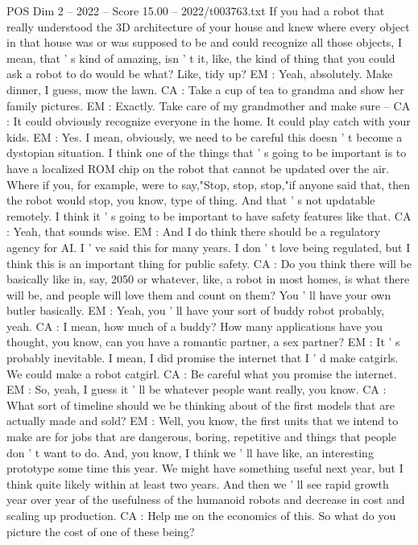 \begin{textsample}{POS Dim 2 – 2022 – Score 15.00 – 2022/t003763.txt}
If you had a robot that really understood the 3D architecture of your house and knew where every object in that house was or was supposed to be and could recognize all those objects, I mean, that ' s kind of amazing, isn ' t it, like, the kind of thing that you could ask a robot to do would be what?
Like, tidy up?
EM : Yeah, absolutely.
Make dinner, I guess, mow the lawn.
CA : Take a cup of tea to grandma and show her family pictures.
EM : Exactly.
Take care of my grandmother and make sure -- CA : It could obviously recognize everyone in the home.
It could play catch with your kids.
EM : Yes.
I mean, obviously, we need to be careful this doesn ' t become a dystopian situation.
I think one of the things that ' s going to be important is to have a localized ROM chip on the robot that cannot be updated over the air.
Where if you, for example, were to say,"Stop, stop, stop,"if anyone said that, then the robot would stop, you know, type of thing.
And that ' s not updatable remotely.
I think it ' s going to be important to have safety features like that.
CA : Yeah, that sounds wise.
EM : And I do think there should be a regulatory agency for AI.
I ' ve said this for many years.
I don ' t love being regulated, but I think this is an important thing for public safety.
CA : Do you think there will be basically like in, say, 2050 or whatever, like, a robot in most homes, is what there will be, and people will love them and count on them?
You ' ll have your own butler basically.
EM : Yeah, you ' ll have your sort of buddy robot probably, yeah.
CA : I mean, how much of a buddy?
How many applications have you thought, you know, can you have a romantic partner, a sex partner?
EM : It ' s probably inevitable.
I mean, I did promise the internet that I ' d make catgirls.
We could make a robot catgirl.
CA : Be careful what you promise the internet.
EM : So, yeah, I guess it ' ll be whatever people want really, you know.
CA : What sort of timeline should we be thinking about of the first models that are actually made and sold?
EM : Well, you know, the first units that we intend to make are for jobs that are dangerous, boring, repetitive and things that people don ' t want to do.
And, you know, I think we ' ll have like, an interesting prototype some time this year.
We might have something useful next year, but I think quite likely within at least two years.
And then we ' ll see rapid growth year over year of the usefulness of the humanoid robots and decrease in cost and scaling up production.
CA : Help me on the economics of this.
So what do you picture the cost of one of these being?

\end{textsample}
